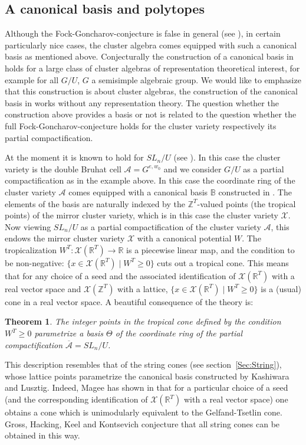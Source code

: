 \documentclass{emsprocart}
\newtheorem{theorem}{Theorem}[section]
\theoremstyle{definition}
\begin{document}
\subsection{A canonical basis and polytopes}\label{canbasis}
Although the Fock-Goncharov-con\-jecture is false in general (see \cite{GHK}), in certain particularly nice cases, the cluster algebra comes equipped with such a canonical basis as mentioned above. 
Conjecturally the construction of a canonical basis in \cite{GHKK} holds for a large class of cluster algebras of representation theoretical interest, for example for 
all $G/U$, $G$ a semisimple algebraic group. We would like to emphasize that this construction is about cluster algebras, 
the construction of the canonical basis in \cite{GHKK} works without any representation theory.
The question whether the construction above provides a basis or not is related to the question whether 
the full Fock-Goncharov-conjecture holds for the cluster variety respectively its partial compactification.
 
At the moment it is known to hold for $SL_n/U$ (see  \cite{M}). 
In this case the cluster variety is the double Bruhat cell $\mathcal A = G^{e,w_0}$
and we consider $G/U$ as a partial compactification as in the example above. 
In this case the coordinate ring of the cluster variety $\mathcal A$ comes equipped with a canonical basis $\mathbb B$ constructed in \cite{GHKK}.
The elements of the basis are naturally indexed by the $\mathbb Z^T$-valued points (the tropical points) of the mirror cluster variety,
which is in this case the cluster variety $\mathcal X$. Now viewing $SL_n/U$ as a partial  compactification
of the cluster variety $\mathcal A$, this endows the mirror cluster variety $\mathcal X$ with a canonical potential $W$. The tropicalization $W^T:\mathcal X(\mathbb R^T) \rightarrow \mathbb R$ is a piecewise linear map, and the  condition to be non-negative: $\{x\in \mathcal X(\mathbb R^T) \mid W^T\ge 0\}$
cuts out a tropical cone. This means that for any choice of a seed and the associated identification of $\mathcal X(\mathbb R^T)$ with a real vector space 
and  $\mathcal X(\mathbb Z^T)$ with a lattice, $\{x\in \mathcal X(\mathbb R^T) \mid W^T\ge 0\}$ is a (usual) cone in a real vector space. A beautiful
consequence of the theory is:
\begin{theorem}\cite{GHKK,M}
The integer points in the tropical cone defined by the condition $ W^T\ge 0$ parametrize a basis $\Theta$ of the coordinate 
ring of the partial compactification $\overline{\mathcal A}=SL_n/U$. 
\end{theorem}
This description resembles that of the string cones (see section~\ref{Sec:String}), whose lattice points parametrize
the canonical basis constructed by Kashiwara and Lusztig. 
Indeed, Magee has shown in \cite{M} that for a particular choice of a seed (and the corresponding identification of 
$\mathcal X(\mathbb R^T)$ with a real vector space) one obtains a cone 
which is unimodularly equivalent to the Gelfand-Tsetlin cone.
Gross, Hacking, Keel and Kontsevich conjecture that all string cones can be obtained in this way.
\end{document}
